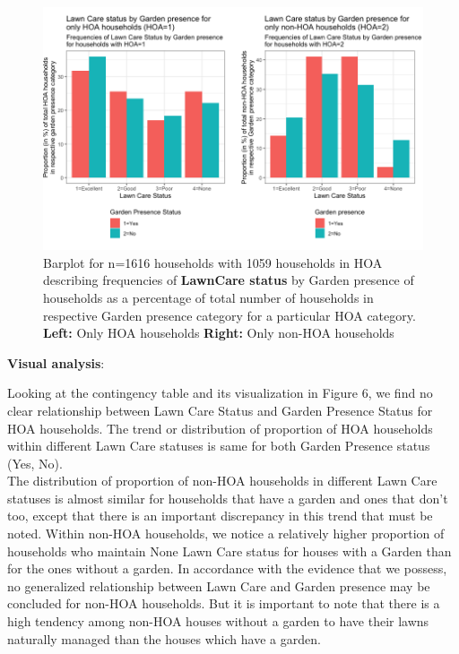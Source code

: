\documentclass{article}
\begin{document}
\begin{figure}[H]
\centering
\includegraphics[scale=2]{LawnCareGarden.png}
\caption{Barplot for n=1616 households with 1059 households in HOA describing frequencies of \textbf{LawnCare status} by Garden presence of households as a percentage of total number of households in respective Garden presence category for a particular HOA category. \textbf{Left:} Only HOA households \textbf{Right:} Only non-HOA households} \label{Fig:Plot1}
\end{figure}

\textbf{Visual analysis}:

Looking at the contingency table and its visualization in Figure 6, we find no clear relationship between Lawn Care Status and Garden Presence Status for HOA households. The trend or distribution of proportion of HOA households within different Lawn Care statuses is same for both Garden Presence status (Yes, No). \\

The distribution of proportion of non-HOA households in different Lawn Care statuses is almost similar for households that have a garden and ones that don't too, except that there is an important discrepancy in this trend that must be noted. Within non-HOA households, we notice a relatively higher proportion of households who maintain None Lawn Care status for houses with a Garden than for the ones without a garden. In accordance with the evidence that we possess, no generalized relationship between Lawn Care and Garden presence may be concluded for non-HOA households. But it is important to note that there is a high tendency among non-HOA houses without a garden to have their lawns naturally managed than the houses which have a garden.\\
\end{document}

